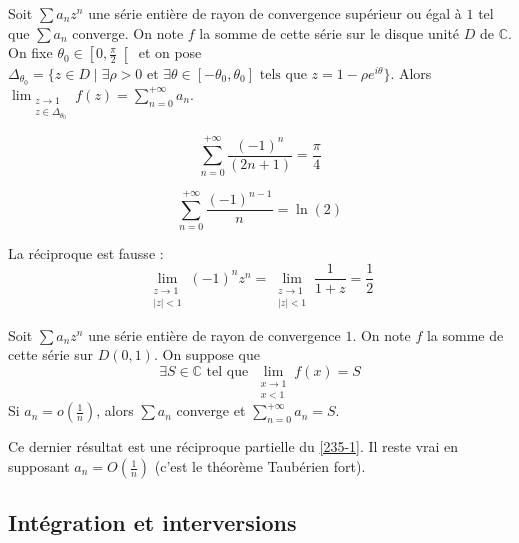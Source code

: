   \begin{theorem}
    \label{235-1}
    Soit $\sum a_n z^n$ une série entière de rayon de convergence supérieur ou égal à $1$ tel que $\sum a_n$ converge. On note $f$ la somme de cette série sur le disque unité $D$ de $\mathbb{C}$. On fixe $\theta_0 \in \left[ 0, \frac{\pi}{2} \right[$ et on pose $\Delta_{\theta_0} = \{ z \in D \mid \exists \rho > 0 \text{ et } \exists \theta \in [-\theta_0, \theta_0] \text{ tels que } z = 1 - \rho e^{i\theta} \}$.
    \newpar
    Alors $\lim_{\substack{z \rightarrow 1 \\ z \in \Delta_{\theta_0}}} f(z) = \sum_{n=0}^{+\infty} a_n$.
  \end{theorem}

  \begin{application}
    \[ \sum_{n=0}^{+\infty} \frac{(-1)^n}{(2n+1)} = \frac{\pi}{4} \]
  \end{application}

  \begin{application}
    \[ \sum_{n=0}^{+\infty} \frac{(-1)^{n-1}}{n} = \ln(2) \]
  \end{application}

  \begin{cexample}
    La réciproque est fausse :
    \[ \lim_{\substack{z \rightarrow 1 \\ \vert z \vert < 1}} (-1)^n z^n = \lim_{\substack{z \rightarrow 1 \\ \vert z \vert < 1}} \frac{1}{1+z} = \frac{1}{2} \]
  \end{cexample}

  \begin{theorem}
    Soit $\sum a_n z^n$ une série entière de rayon de convergence $1$. On note $f$ la somme de cette série sur $D(0,1)$. On suppose que
    \[ \exists S \in \mathbb{C} \text{ tel que } \lim_{\substack{x \rightarrow 1 \\ x < 1}} f(x) = S \]
    Si $a_n = o \left( \frac{1}{n} \right)$, alors $\sum a_n$ converge et $\sum_{n=0}^{+\infty} a_n = S$.
  \end{theorem}

  \begin{remark}
    Ce dernier résultat est une réciproque partielle du \cref{235-1}. Il reste vrai en supposant $a_n = O \left( \frac{1}{n} \right)$ (c'est le théorème Taubérien fort).
  \end{remark}

  \subsection{Intégration et interversions}

